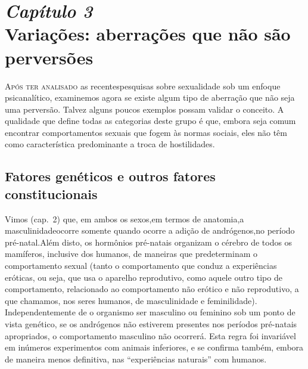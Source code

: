 \chapter[\textbf{3}\quad Variações: aberrações que não são perversões]{{\large\textit{Capítulo 3}}\\ Variações: aberrações que não são perversões}


\textsc{Após ter analisado} as recentes\idxvaria[|(] pesquisas sobre sexualidade sob um
enfoque psicanalítico, examinemos agora se existe algum tipo de
aberração que não seja uma perversão. Talvez alguns poucos exemplos
possam validar o conceito. A qualidade que define todas as categorias
deste grupo é que, embora seja comum encontrar comportamentos sexuais
que fogem às normas sociais, eles não têm como característica
predominante a troca de hostilidades.




\section{Fatores genéticos e outros fatores constitucionais}

Vimos (cap.~2) que, em ambos os sexos,\idxanimdese[|(] em termos de anatomia,\idxidenpre[|(] a
masculinidade\idxhormdese[|(] ocorre somente quando ocorre a adição de andrógenos,\idxandrn[|(] no
período pré-natal.\idxprenat[|(] Além disto, os hormônios pré-natais organizam o
cérebro de todos os mamíferos, inclusive dos humanos, de maneiras que
predeterminam o comportamento sexual (tanto o comportamento que conduz
a experiências eróticas, ou seja, que usa o aparelho reprodutivo, como
aquele outro tipo de comportamento, relacionado ao comportamento não
erótico e não reprodutivo, a que chamamos, nos seres humanos, de
masculinidade e feminilidade). Independentemente de o organismo ser
masculino ou feminino sob um ponto de vista genético, se os andrógenos
não estiverem presentes nos períodos pré-natais apropriados, o
comportamento masculino não ocorrerá. Esta regra foi invariável em
inúmeros experimentos com animais inferiores, e se confirma também,
embora de maneira menos definitiva, nas ``experiências naturais''\idxexpen{} com
humanos.

